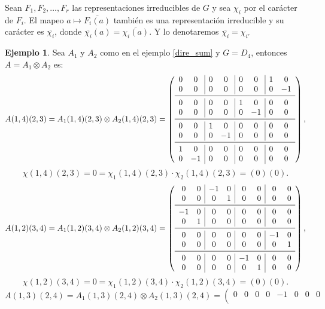 \documentclass[12pt]{book}
\theoremstyle{definition}
\newtheorem{example}[theorem]{Ejemplo}
\newcounter{in}
\begin{document}
Sean $F_{1}, F_{2}, \ldots, F_{r}$ las representaciones irreducibles de
$G$ y sea $\chi_{i}$ por el carácter de $F_{i}$. El mapeo
$a \mapsto \overline{F_{i}(a)}$ también es una representación
irreducible y su carácter es $\overline{\chi_{i}}$, donde
$\overline{\chi_{i}}(a) = \overline{\chi_{i}(a)}$. Y lo denotaremos
$\overline{\chi_{i}}=\chi_{i'}$
\begin{example}
\label{kronec_prod}
Sea $A_{1}$ y $A_{2}$ como en el ejemplo \ref{dire_sum} y $G = D_{4}$, entonces $A = A_{1} \otimes A_{2}$ es:
\[
A(1, 4)(2, 3) = A_{1}(1, 4)(2, 3) \otimes A_{2}(1, 4)(2, 3) =
\left( \begin{array}{cc|cc|cc|cc}
0 &  0 & 0 &  0 & 0 &  0 & 1 &  0  \\
0 &  0 & 0 &  0 & 0 &  0 & 0 & -1  \\
\midrule
0 &  0 & 0 &  0 & 1 &  0 & 0 &  0  \\
0 &  0 & 0 &  0 & 0 & -1 & 0 &  0  \\
\midrule
0 &  0 & 1 &  0 & 0 &  0 & 0 &  0  \\
0 &  0 & 0 & -1 & 0 &  0 & 0 &  0  \\
\midrule
1 &  0 & 0 &  0 & 0 &  0 & 0 &  0  \\
0 & -1 & 0 &  0 & 0 &  0 & 0 &  0 \\
\end{array}\right),  
\]
$$\chi(1, 4)(2, 3)= 0 = \chi_{1}(1, 4)(2, 3) \cdot \chi_{2}(1, 4)(2, 3) = (0)(0). $$
\[ 
A(1, 2)(3, 4) = A_{1}(1, 2)(3, 4) \otimes A_{2}(1, 2)(3, 4) =
\left( \begin{array}{cc|cc|cc|cc}
0 & 0 & -1 & 0 &  0 & 0 &  0 & 0  \\
 0 & 0 &  0 & 1 &  0 & 0 &  0 & 0  \\
\midrule
-1 & 0 &  0 & 0 &  0 & 0 &  0 & 0  \\
 0 & 1 &  0 & 0 &  0 & 0 &  0 & 0  \\
\midrule
 0 & 0 &  0 & 0 &  0 & 0 & -1 & 0  \\
 0 & 0 &  0 & 0 &  0 & 0 &  0 & 1  \\
\midrule
 0 & 0 &  0 & 0 & -1 & 0 &  0 & 0  \\
 0 & 0 &  0 & 0 &  0 & 1 &  0 & 0 \\
\end{array}\right),
\]
$$\chi(1, 2)(3, 4)= 0 = \chi_{1}(1, 2)(3, 4) \cdot \chi_{2}(1, 2)(3, 4) = (0)(0). $$
\[
A(1, 3)(2, 4) = A_{1}(1, 3)(2, 4) \otimes A_{2}(1, 3)(2, 4) =
\left( \begin{array}{cc|cc|cc|cc}
 0 &  0 &  0 &  0 & -1 &  0 &  0 &  0  \\

\end{array}\]
\end{example}
\end{document}
